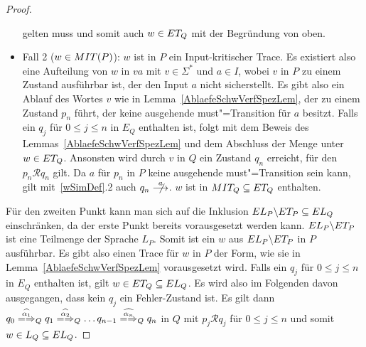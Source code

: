 \begin{proof}
\begin{itemize}
      gelten muss und somit auch $w\in ET _Q$ mit der Begründung von oben.
    \item Fall 2 ($w\in MIT (P)$): $w$ ist in $P$ ein Input-kritischer Trace.
      Es existiert also eine Aufteilung von $w$ in $va$ mit $v\in \Sigma ^*$
      und $a\in I$, wobei $v$ in $P$ zu einem Zustand ausführbar ist, der den
      Input $a$ nicht sicherstellt. Es gibt also ein Ablauf des Wortes $v$ wie
      in Lemma~\ref{AblaefeSchwVerfSpezLem}, der zu einem Zustand $p_n$ führt,
      der keine ausgehende must"=Transition für $a$ besitzt. Falls ein $q_j$
      für $0 \leq j \leq n$ in $E_Q$ enthalten ist, folgt mit dem Beweis des
      Lemmas~\ref{AblaefeSchwVerfSpezLem} und dem Abschluss der Menge \ET{}
      unter \cont{} $w\in ET _Q$. Ansonsten wird durch $v$ in $Q$ ein Zustand
      $q_n$ erreicht, für den $p_n\mathcal{R} q_n$ gilt. Da $a$ für $p_n$ in
      $P$ keine ausgehende must"=Transition sein kann, gilt mit~\ref{wSimDef}.2
      auch $q_n \nmust[a]$. $w$ ist in $MIT _Q \subseteq ET _Q$ enthalten.
  \end{itemize}
  Für den zweiten Punkt kann man sich auf die Inklusion $EL _P\backslash ET _P
  \subseteq EL _Q$ einschränken, da der erste Punkt bereits vorausgesetzt
  werden kann. $EL _P\backslash ET _P$ ist eine Teilmenge der Sprache $L _P$.
  Somit ist ein $w$ aus $EL _P\backslash ET _P$ in $P$ ausführbar. Es gibt
  also einen Trace für $w$ in $P$ der Form, wie sie in
  Lemma~\ref{AblaefeSchwVerfSpezLem} vorausgesetzt wird. Falls ein $q_j$ für $0
  \leq j \leq n$ in $E_Q$ enthalten ist, gilt $w\in ET _Q \subseteq EL _Q$. Es
  wird also im Folgenden davon ausgegangen, dass kein $q_j$ ein Fehler-Zustand
  ist. Es gilt dann $q_0 \weakmay[\widehat{\alpha _1}]_Q q_1
  \weakmay[\widehat{\alpha _2}]_Q \dots q_{n-1} \weakmay[\widehat{\alpha _n}]_Q
  q_n$ in $Q$ mit $p_j \mathcal{R} q_j$ für $0 \leq j \leq n$ und somit $w\in L
  _Q\subseteq EL _Q$.


\end{proof}
